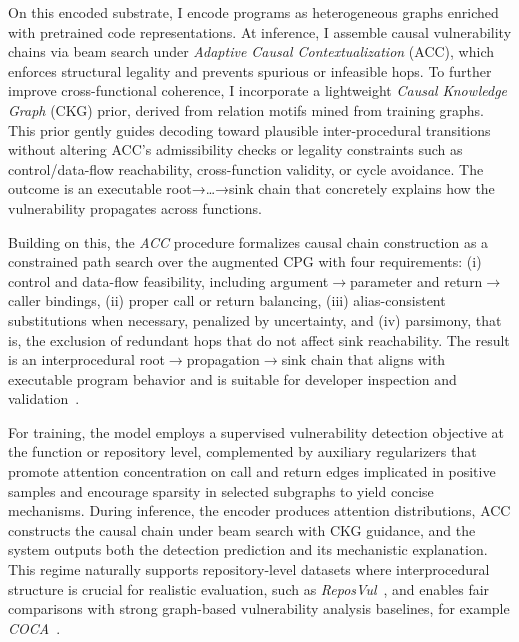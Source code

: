 \documentclass{buthesis}
\begin{document}
On this encoded substrate, I encode programs as heterogeneous graphs enriched with pretrained code representations. At inference, I assemble causal vulnerability chains via beam search under \emph{Adaptive Causal Contextualization} (ACC), which enforces structural legality and prevents spurious or infeasible hops. To further improve cross-functional coherence, I incorporate a lightweight \emph{Causal Knowledge Graph} (CKG) prior, derived from relation motifs mined from training graphs. This prior gently guides decoding toward plausible inter-procedural transitions without altering ACC’s admissibility checks or legality constraints such as control/data-flow reachability, cross-function validity, or cycle avoidance. The outcome is an executable root→…→sink chain that concretely explains how the vulnerability propagates across functions.

Building on this, the \emph{ACC} procedure formalizes causal chain construction as a constrained path search over the augmented CPG with four requirements: (i) control and data-flow feasibility, including argument$\rightarrow$parameter and return$\rightarrow$caller bindings, (ii) proper call or return balancing, (iii) alias-consistent substitutions when necessary, penalized by uncertainty, and (iv) parsimony, that is, the exclusion of redundant hops that do not affect sink reachability. The result is an interprocedural root$\rightarrow$propagation$\rightarrow$sink chain that aligns with executable program behavior and is suitable for developer inspection and validation~\cite{Zhou2019,hin2022linevd}.

For training, the model employs a supervised vulnerability detection objective at the function or repository level, complemented by auxiliary regularizers that promote attention concentration on call and return edges implicated in positive samples and encourage sparsity in selected subgraphs to yield concise mechanisms. During inference, the encoder produces attention distributions, ACC constructs the causal chain under beam search with CKG guidance, and the system outputs both the detection prediction and its mechanistic explanation. This regime naturally supports repository-level datasets where interprocedural structure is crucial for realistic evaluation, such as \emph{ReposVul}~\cite{wang2024reposvul}, and enables fair comparisons with strong graph-based vulnerability analysis baselines, for example \emph{COCA}~\cite{Zhou2019,Cao2024ICSE}.
\end{document}
